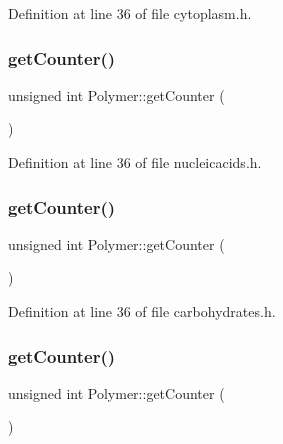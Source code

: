 Definition at line 36 of file cytoplasm.\+h.

\mbox{\label{class_polymer_a8346d821e5f8690d7816ba1d40036b69}} 
\subsubsection{\texorpdfstring{get\+Counter()}{getCounter()}\hspace{0.1cm}{\footnotesize\ttfamily [6/10]}}
{\footnotesize\ttfamily unsigned int Polymer\+::get\+Counter (\begin{DoxyParamCaption}{ }\end{DoxyParamCaption})\hspace{0.3cm}{\ttfamily [inline]}}



Definition at line 36 of file nucleicacids.\+h.

\mbox{\label{class_polymer_a8346d821e5f8690d7816ba1d40036b69}} 
\subsubsection{\texorpdfstring{get\+Counter()}{getCounter()}\hspace{0.1cm}{\footnotesize\ttfamily [7/10]}}
{\footnotesize\ttfamily unsigned int Polymer\+::get\+Counter (\begin{DoxyParamCaption}{ }\end{DoxyParamCaption})\hspace{0.3cm}{\ttfamily [inline]}}



Definition at line 36 of file carbohydrates.\+h.

\mbox{\label{class_polymer_a8346d821e5f8690d7816ba1d40036b69}} 
\subsubsection{\texorpdfstring{get\+Counter()}{getCounter()}\hspace{0.1cm}{\footnotesize\ttfamily [8/10]}}
{\footnotesize\ttfamily unsigned int Polymer\+::get\+Counter (\begin{DoxyParamCaption}{ }\end{DoxyParamCaption})\hspace{0.3cm}{\ttfamily [inline]}}



